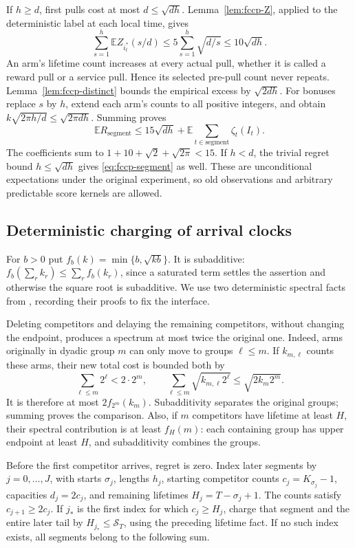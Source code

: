 \documentclass[11pt]{article}
\theoremstyle{remark}
\newcommand{\E}{\mathbb E}
\begin{document}
If $h\ge d$, first pulls cost at most $d\le\sqrt{dh}$.
Lemma~\ref{lem:fccp-Z}, applied to the deterministic label at each
local time, gives
\[
 \sum_{s=1}^h\E Z_{i_t^*}(s/d)
        \le5\sum_{s=1}^h\sqrt{d/s}\le10\sqrt{dh}.
\]
An arm's lifetime count increases at every actual pull, whether it is
called a reward pull or a service pull. Hence its selected pre-pull
count never repeats. Lemma~\ref{lem:fccp-distinct} bounds the empirical
excess by $\sqrt{2dh}$. For bonuses replace $s$ by $h$, extend each
arm's counts to all positive integers, and obtain
$k\sqrt{2\pi h/d}\le\sqrt{2\pi dh}$. Summing proves
\begin{equation}\label{eq:fccp-segment}
 \E R_{\mathrm{segment}}\le
  15\sqrt{dh}+\E\sum_{t\in\mathrm{segment}}\zeta_t(I_t).
\end{equation}
The coefficients sum to
$1+10+\sqrt2+\sqrt{2\pi}<15$. If $h<d$, the trivial regret bound
$h\le\sqrt{dh}$ gives \eqref{eq:fccp-segment} as well. These are
unconditional expectations under the original experiment, so old
observations and arbitrary predictable score kernels are allowed.

\subsection{Deterministic charging of arrival clocks}
For $b>0$ put $f_b(k)=\min\{b,\sqrt{kb}\}$. It is subadditive:
$f_b(\sum_rk_r)\le\sum_rf_b(k_r)$, since a saturated term settles
the assertion and otherwise the square root is subadditive.
We use two deterministic spectral facts from
\citet{temporalgeometry2026}, recording their proofs to fix the interface.

Deleting competitors and delaying the remaining competitors, without
changing the endpoint, produces a spectrum at most twice the original
one. Indeed, arms originally in dyadic group $m$ can only move to
groups $\ell\le m$. If $k_{m,\ell}$ counts these arms, their new total
cost is bounded both by
\[
 \sum_{\ell\le m}2^\ell<2\cdot2^m,\qquad
 \sum_{\ell\le m}\sqrt{k_{m,\ell}2^\ell}
       \le\sqrt{2k_m2^m}.
\]
It is therefore at most $2f_{2^m}(k_m)$. Subadditivity separates the
original groups; summing proves the comparison. Also, if $m$
competitors have lifetime at least $H$, their spectral contribution is
at least $f_H(m)$: each containing group has upper endpoint at least
$H$, and subadditivity combines the groups.

Before the first competitor arrives, regret is zero. Index later
segments by $j=0,\ldots,J$, with starts $\sigma_j$, lengths $h_j$,
starting competitor counts $c_j=K_{\sigma_j}-1$, capacities
$d_j=2c_j$, and remaining lifetimes $H_j=T-\sigma_j+1$.
The counts satisfy $c_{j+1}\ge2c_j$.
If $j_*$ is the first index for which $c_j\ge H_j$, charge that
segment and the entire later tail by $H_{j_*}\le\mathcal S_T$,
using the preceding lifetime fact. If no such index exists, all
segments belong to the following sum.
\end{document}
